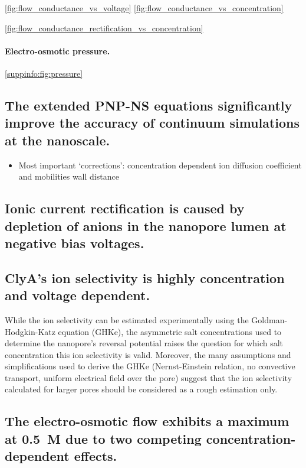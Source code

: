 \documentclass[journal=ancac3,manuscript=article,etalmode=truncate,maxauthors=0,layout=twocolumn]{achemso}
\begin{document}
\cite{Mao-2014,Laohakunakorn-2015}



\cref{fig:flow_conductance_vs_voltage}
\cref{fig:flow_conductance_vs_concentration}


\cref{fig:flow_conductance_rectification_vs_concentration}

\paragraph{Electro-osmotic pressure.}
\cref{suppinfo:fig:pressure}
\cite{Hoogerheide-2014}


\subsection{The extended PNP-NS equations significantly improve the accuracy of continuum simulations at the
nanoscale.}

\begin{itemize}
  \item Most important `corrections':
  \subitem concentration dependent ion diffusion coefficient and mobilities
  \subitem wall distance
\end{itemize}

\subsection{Ionic current rectification is caused by depletion of anions in the nanopore lumen at negative
bias voltages.}

\subsection{ClyA's ion selectivity is highly concentration and voltage dependent.}
While the ion selectivity can be estimated experimentally using the Goldman-Hodgkin-Katz
equation (GHKe),\cite{Franceschini-2016,Huang-2017} the asymmetric salt concentrations used to determine the
nanopore's reversal potential raises the question for which salt concentration this ion selectivity is valid.
Moreover, the many assumptions and simplifications used to derive the GHKe (Nernst-Einstein relation, no
convective transport, uniform electrical field over the pore) suggest that the ion selectivity calculated for
larger pores should be considered as a rough estimation only.

\subsection{The electro-osmotic flow exhibits a maximum at 0.5~M due to two competing concentration-dependent
effects.}
\end{document}
